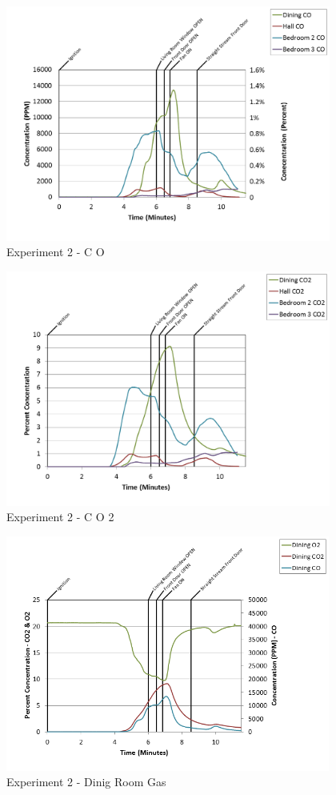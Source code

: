 \documentclass{article}
\begin{document}
\begin{appendices}
\clearpage

\begin{figure}[h!]
	\centering
	\includegraphics[height=3.05in]{0_Images/Results_Charts/Exp_2_Charts/CO.png}
	\caption{Experiment 2 - C O}
\end{figure}


\begin{figure}[h!]
	\centering
	\includegraphics[height=3.05in]{0_Images/Results_Charts/Exp_2_Charts/CO2.png}
	\caption{Experiment 2 - C O 2}
\end{figure}

\clearpage

\begin{figure}[h!]
	\centering
	\includegraphics[height=3.05in]{0_Images/Results_Charts/Exp_2_Charts/DinigRoomGas.png}
	\caption{Experiment 2 - Dinig Room Gas}
\end{figure}



\end{appendices}
\end{document}
